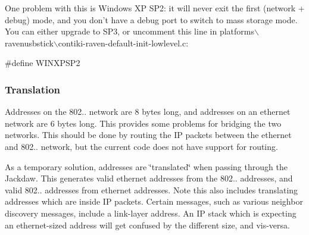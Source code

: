 \-One problem with this is \-Windows \-X\-P \-S\-P2\-: it will never exit the first (network + debug) mode, and you don't have a debug port to switch to mass storage mode. \-You can either upgrade to \-S\-P3, or uncomment this line in platforms$\backslash$ravenusbstick$\backslash$contiki-\/raven-\/default-\/init-\/lowlevel.\-c\-:


\begin{DoxyCode}
#define WINXPSP2
\end{DoxyCode}
\hypertarget{a00053_Address}{}\subsubsection{\-Translation}\label{a00053_Address}
\-Addresses on the 802.. network are 8 bytes long, and addresses on an ethernet network are 6 bytes long. \-This provides some problems for bridging the two networks. \-This should be done by routing the \-I\-P packets between the ethernet and 802.. network, but the current code does not have support for routing.

\-As a temporary solution, addresses are \char`\"{}translated\char`\"{} when passing through the \-Jackdaw. \-This generates valid ethernet addresses from the 802.. addresses, and valid 802.. addresses from ethernet addresses. \-Note this also includes translating addresses which are inside \-I\-P packets. \-Certain messages, such as various neighbor discovery messages, include a link-\/layer address. \-An \-I\-P stack which is expecting an ethernet-\/sized address will get confused by the different size, and vis-\/versa.

